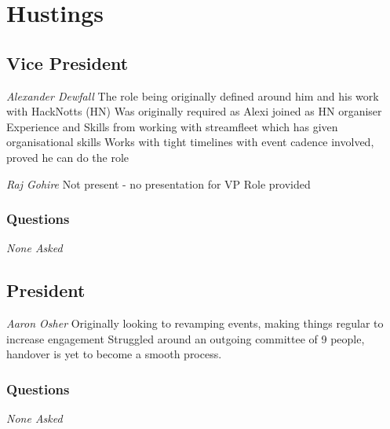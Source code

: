 \documentclass[11pt]{meetingmins}
\begin{document}
\section{Hustings}
\subsection{Vice President}
\begin{items}
	\item
	\textit{Alexander Dewfall}
		\subitem
		The role being originally defined around him and his work with HackNotts (HN)
		\subitem
		Was originally required as Alexi joined as HN organiser
		\subitem
		Experience and Skills from working with streamfleet which has given organisational skills 
		\subitem
		Works with tight timelines with event cadence involved, proved he can do the role

	\item
	\textit{Raj Gohire}
		\subitem
		Not present - no presentation for VP Role provided
\end{items}

\subsubsection{Questions}
\textit{None Asked}

\subsection{President}
\begin{items}
	\item
	\textit{Aaron Osher}	
		\subitem
		Originally looking to revamping events, making things regular to increase engagement
		\subitem
		Struggled around an outgoing committee of 9 people, handover is yet to become a smooth process.
\end{items}

\subsubsection{Questions}
\textit{None Asked}
\end{document}
